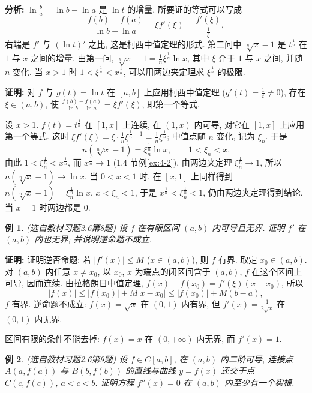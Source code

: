 \documentclass[UTF8,openany]{ctexbook}
\theoremstyle{chinesetextbook}
\newtheorem{example}{例}[section]
\newenvironment{cnproof}{\par\indent\textbf{证明:} \ignorespaces}{\par}
\begin{document}
\par\indent\textbf{分析:} $\displaystyle\ln\frac ba=\ln b-\ln a$ 是 $\ln t$ 的增量, 所要证的等式可以写成
\[
\frac{f(b)-f(a)}{\ln b-\ln a}=\xi f'(\xi)=\frac{f'(\xi)}{\frac1\xi},
\]
右端是 $f'$ 与 $(\ln t)'$ 之比, 这是柯西中值定理的形式. 第二问中 $\sqrt[n]x-1$ 是 $t^{\frac1n}$ 在 $1$ 与 $x$ 之间的增量. 由第一问, $\displaystyle\sqrt[n]x-1=\frac1n\xi^{\frac1n}\ln x$, 其中 $\xi$ 介于 $1$ 与 $x$ 之间, 并随 $n$ 变化. 当 $x>1$ 时 $1<\xi^{\frac1n}<x^{\frac1n}$, 可以用两边夹定理求 $\xi^{\frac1n}$ 的极限.
\begin{cnproof}
对 $f$ 与 $g(t)=\ln t$ 在 $[a,b]$ 上应用柯西中值定理 ($\displaystyle g'(t)=\frac1t\ne0$), 存在 $\xi\in(a,b)$, 使 $\displaystyle\frac{f(b)-f(a)}{\ln b-\ln a}=\xi f'(\xi)$, 即第一个等式.

设 $x>1$. $f(t)=t^{\frac1n}$ 在 $[1,x]$ 上连续, 在 $(1,x)$ 内可导, 对它在 $[1,x]$ 上应用第一个等式. 这时 $\displaystyle\xi f'(\xi)=\xi\cdot\frac1n\xi^{\frac1n-1}=\frac1n\xi^{\frac1n}$; 中值点随 $n$ 变化, 记为 $\xi_n$. 于是
\[
n\left(\sqrt[n]x-1\right)=\xi_n^{\frac1n}\ln x,\qquad1<\xi_n<x.
\]
由此 $1<\xi_n^{\frac1n}<x^{\frac1n}$, 而 $x^{\frac1n}\to1$ (1.4 节例\ref{ex:4-2}), 由两边夹定理 $\xi_n^{\frac1n}\to1$, 所以 $n\left(\sqrt[n]x-1\right)\to\ln x$. 当 $0<x<1$ 时, 在 $[x,1]$ 上同样得到 $n\left(\sqrt[n]x-1\right)=\xi_n^{\frac1n}\ln x$, $x<\xi_n<1$, 于是 $x^{\frac1n}<\xi_n^{\frac1n}<1$, 仍由两边夹定理得到结论. 当 $x=1$ 时两边都是 $0$.
\end{cnproof}
\begin{example}\label{ex:c2-h6-8}
\textnormal{(选自教材习题2.6第8题)} 设 $f$ 在有限区间 $(a,b)$ 内可导且无界. 证明 $f'$ 在 $(a,b)$ 内也无界; 并说明逆命题不成立.
\end{example}
\begin{cnproof}
证明逆否命题: 若 $|f'(x)|\le M$ ($x\in(a,b)$), 则 $f$ 有界. 取定 $x_0\in(a,b)$. 对 $(a,b)$ 内任意 $x\ne x_0$, 以 $x_0$, $x$ 为端点的闭区间含于 $(a,b)$, $f$ 在这个区间上可导, 因而连续. 由拉格朗日中值定理, $f(x)-f(x_0)=f'(\xi)(x-x_0)$, 所以
\[
|f(x)|\le|f(x_0)|+M|x-x_0|\le|f(x_0)|+M(b-a),
\]
$f$ 有界. 逆命题不成立: $f(x)=\sqrt x$ 在 $(0,1)$ 内有界, 但 $\displaystyle f'(x)=\frac1{2\sqrt x}$ 在 $(0,1)$ 内无界.
\end{cnproof}
区间有限的条件不能去掉: $f(x)=x$ 在 $(0,+\infty)$ 内无界, 而 $f'(x)=1$.
\begin{example}\label{ex:c2-h6-9}
\textnormal{(选自教材习题2.6第9题)} 设 $f\in C[a,b]$, 在 $(a,b)$ 内二阶可导, 连接点 $A(a,f(a))$ 与 $B(b,f(b))$ 的直线与曲线 $y=f(x)$ 还交于点 $C(c,f(c))$, $a<c<b$. 证明方程 $f''(x)=0$ 在 $(a,b)$ 内至少有一个实根.
\end{example}
\end{document}
